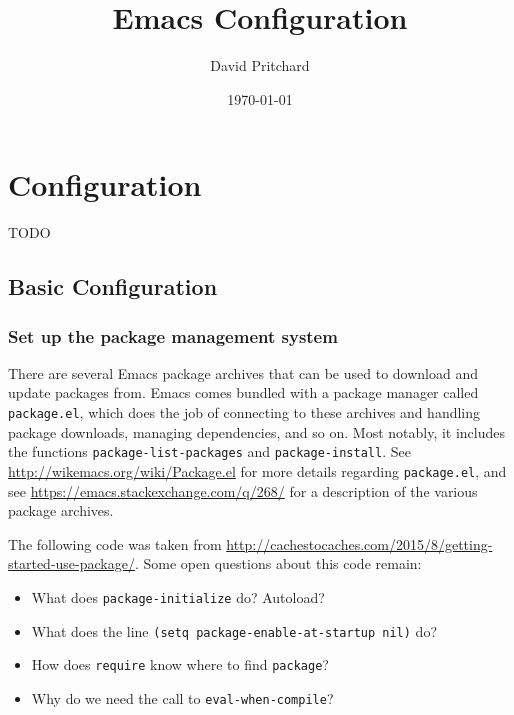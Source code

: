 \documentclass[11pt]{article}
\author{David Pritchard}
\date{\today}
\title{Emacs Configuration}
\begin{document}
\maketitle
\tableofcontents




\section{Configuration}
\label{sec-1}

TODO

\subsection{Basic Configuration}
\label{sec-1-1}

\subsubsection{Set up the package management system}
\label{sec-1-1-1}

There are several Emacs package archives that can be used to download and update
packages from.  Emacs comes bundled with a package manager called \texttt{package.el},
which does the job of connecting to these archives and handling package
downloads, managing dependencies, and so on.  Most notably, it includes the
functions \texttt{package-list-packages} and \texttt{package-install}.  See
\url{http://wikemacs.org/wiki/Package.el} for more details regarding \texttt{package.el}, and
see \url{https://emacs.stackexchange.com/q/268/} for a description of the various
package archives.

The following code was taken from
\url{http://cachestocaches.com/2015/8/getting-started-use-package/}.  Some open
questions about this code remain:
\begin{itemize}
\item What does \texttt{package-initialize} do?  Autoload?
\item What does the line \texttt{(setq package-enable-at-startup nil)} do?
\item How does \texttt{require} know where to find \texttt{package}?
\item Why do we need the call to \texttt{eval-when-compile}?
\end{itemize}
\end{document}
